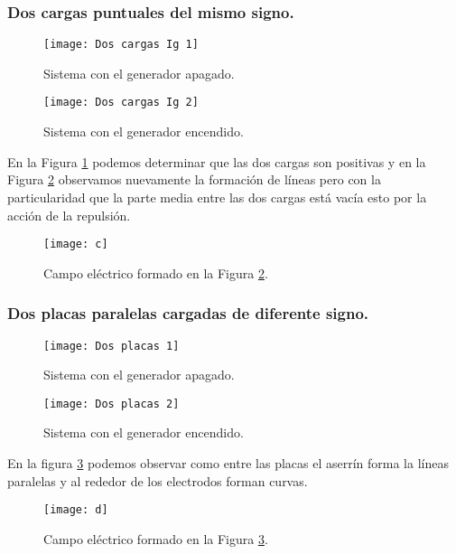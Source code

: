 \documentclass[spanish,10pt,a4paper,onecolumn]{article}
\begin{document}
\newpage
\subsubsection{Dos cargas puntuales del mismo signo.}

\begin{figure}[h!]
	\centering
	\texttt{[image: Dos cargas Ig 1]}
	\caption{Sistema con el generador apagado.}
	\label{fig:2CarIA}
\end{figure}

\begin{figure}[h!]
	\centering
	\texttt{[image: Dos cargas Ig 2]}
	\caption{Sistema con el generador encendido.}
	\label{fig:2CarI}
\end{figure}

En la Figura \ref{fig:2CarIA} podemos determinar que las dos cargas son positivas y en la Figura \ref{fig:2CarI} observamos nuevamente la formación de líneas pero con la particularidad que la parte media entre las dos cargas está vacía esto por la acción de la repulsión.

\begin{figure}[h!]
	\centering
	\texttt{[image: c]}
	\caption{Campo eléctrico formado en la Figura \ref{fig:2CarI}.}
\end{figure}

\subsubsection{Dos placas paralelas cargadas de diferente signo.}

\begin{figure}[h!]
	\centering
	\texttt{[image: Dos placas 1]}
	\caption{Sistema con el generador apagado.}
\end{figure}

\begin{figure}[h!]
	\centering
	\texttt{[image: Dos placas 2]}
	\caption{Sistema con el generador encendido.}
	\label{fig:DosPlacas}
\end{figure}

En la figura \ref{fig:DosPlacas} podemos observar como entre las placas el aserrín forma la líneas paralelas y al rededor de los electrodos forman curvas.

\begin{figure}[h!]
	\centering
	\texttt{[image: d]}
	\caption{Campo eléctrico formado en la Figura \ref{fig:DosPlacas}.}
\end{figure}
\end{document}
